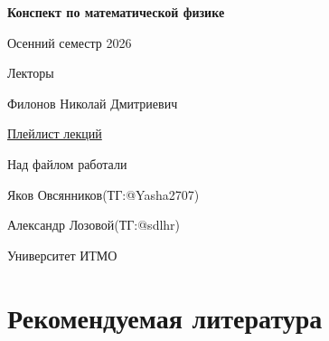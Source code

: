 \documentclass[11pt,a4paper]{report}
\numberwithin{equation}{section}
\numberwithin{figure}{chapter}
\numberwithin{table}{chapter}
\begin{document}
\begin{titlepage}
\thispagestyle{empty}
\centering

\vspace*{0.8cm}

{\Huge\bfseries Конспект по математической физике \par}
\vspace{0.4cm}

{\Large Осенний семестр 2026\par}

\vspace{0.6cm}


\vspace{0.4cm}

\vfill

{\large Лекторы\par}
\vspace{0.2cm}
{\Large Филонов Николай Дмитриевич\par}



{\large \href{https://www.youtube.com/playlist?list=PLY00npmGiNp8}
{Плейлист лекций}}
\vspace{0.2cm}
{\normalsize

\par}

\vspace{0.7cm}

{\large Над файлом работали\par}
\vspace{0.2cm}
{\normalsize
Яков Овсянников(ТГ:@Yasha2707)\par }
{\normalsize
Александр Лозовой(ТГ:@sdlhr)\par}

\vspace{1.2cm}

{\large Университет ИТМО\par}

\end{titlepage}

\clearpage
\section*{Рекомендуемая литература}
\end{document}
